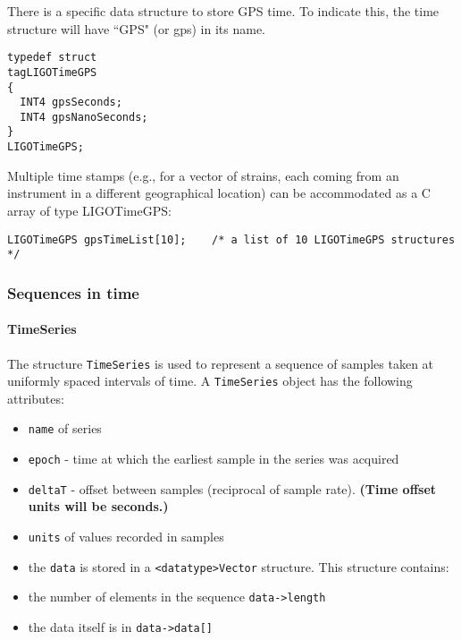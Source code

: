 \documentclass[]{ligodcc}
\renewcommand{\texttt}[1]{{\ttfamily\color{blue}#1}}
\begin{document}
There is a specific data structure to store GPS time. To indicate
this, the time structure will have ``GPS" (or gps) in its name. 

{\footnotesize
\begin{verbatim}
typedef struct
tagLIGOTimeGPS
{
  INT4 gpsSeconds;
  INT4 gpsNanoSeconds;
}
LIGOTimeGPS;
\end{verbatim}}

Multiple time stamps (e.g., for a vector of strains, each coming from
an instrument in a different geographical location) can be
accommodated as a C array of type LIGOTimeGPS:
{\footnotesize
\begin{verbatim}
LIGOTimeGPS gpsTimeList[10];	/* a list of 10 LIGOTimeGPS structures */
\end{verbatim}}

\subsubsection{Sequences in time}


\paragraph{{\texttt {TimeSeries}} \\}

The structure {\tt TimeSeries} is used to represent a sequence of samples
taken at uniformly spaced intervals of time. A {\tt TimeSeries} object has
the following attributes:


\begin{itemize}
\vspace{-0.15in}
\item
{\tt name} of series
\vspace{-0.15in}
\item
{\tt epoch} - time at which the earliest sample in the series was acquired
\vspace{-0.15in}
\item
{\tt deltaT} -  offset between samples (reciprocal of sample rate).  
{\bf (Time offset units will be seconds.)}
\vspace{-0.15in}
\item
{\tt units} of values recorded in samples
\vspace{-0.15in}
\item
the {\tt data} is stored in a  {\tt <datatype>Vector}  structure. This structure contains:
\vspace{-0.15in}
\item
the number of elements in the sequence {\tt data->length}
\vspace{-0.15in}
\item
the data itself is in {\tt data->data[]}
\end{itemize}
\end{document}
